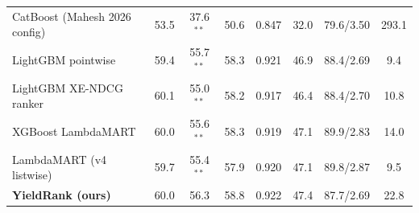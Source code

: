 \begin{tabular}{lccccccc}
CatBoost (Mahesh 2026 config)~\cite{mahesh2026} & 53.5 & 37.6$^{**}$ & 50.6 & 0.847 & 32.0 & 79.6/3.50 & 293.1 \\
LightGBM pointwise & 59.4 & 55.7$^{**}$ & 58.3 & 0.921 & 46.9 & 88.4/2.69 & 9.4 \\
LightGBM XE-NDCG ranker & 60.1 & 55.0$^{**}$ & 58.2 & 0.917 & 46.4 & 88.4/2.70 & 10.8 \\
XGBoost LambdaMART & 60.0 & 55.6$^{**}$ & 58.3 & 0.919 & 47.1 & 89.9/2.83 & 14.0 \\
LambdaMART (v4 listwise) & 59.7 & 55.4$^{**}$ & 57.9 & 0.920 & 47.1 & 89.8/2.87 & 9.5 \\
\textbf{YieldRank (ours)} & 60.0 & 56.3 & 58.8 & 0.922 & 47.4 & 87.7/2.69 & 22.8 \\
\bottomrule
\end{tabular}
